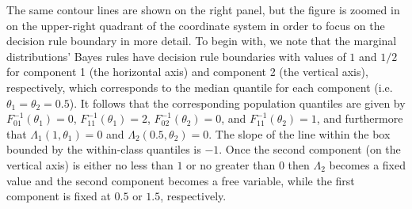 The same contour lines are shown on the right panel, but the figure is zoomed in
on the upper-right quadrant of the coordinate system in order to focus on the
decision rule boundary in more detail.  To begin with, we note that the marginal
distributions' Bayes rules have decision rule boundaries with values of $1$ and
$1/2$ for component 1 (the horizontal axis) and component 2 (the vertical axis),
respectively, which corresponds to the median quantile for each component (i.e.
$\theta_1 = \theta_2 = 0.5$).  It follows that the corresponding population
quantiles are given by $F_{01}^{-1}(\theta_1) = 0$, $F_{11}^{-1}(\theta_1) = 2$,
$F_{02}^{-1}(\theta_2) = 0$, and $F_{11}^{-1}(\theta_2) = 1$, and furthermore
that $\Lambda_1(1, \theta_1) = 0$ and $\Lambda_2(0.5, \theta_2) = 0$.  The slope
of the line within the box bounded by the within-class quantiles is $-1$.  Once
the second component (on the vertical axis) is either no less than $1$ or no
greater than $0$ then $\Lambda_2$ becomes a fixed value and the second component
becomes a free variable, while the first component is fixed at $0.5$ or $1.5$,
respectively.

